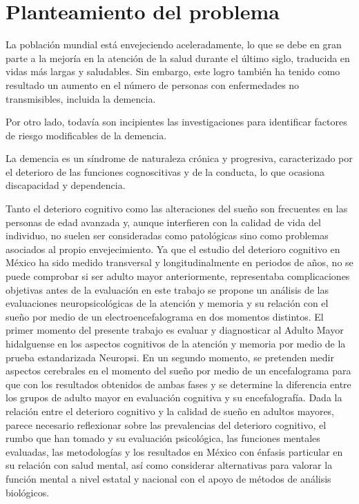\chapter{Planteamiento del problema}

La poblaci\'on mundial est\'a envejeciendo aceleradamente, lo que se debe en gran parte a la 
mejor\'ia en la atenci\'on de la salud durante el \'ultimo siglo, traducida en vidas m\'as 
largas y saludables. Sin embargo, este logro tambi\'en ha tenido como resultado un aumento en el 
n\'umero de personas con enfermedades no transmisibles, incluida la demencia.

Por otro lado, todav\'ia son incipientes las investigaciones para identificar 
factores de riesgo modificables de la demencia.

La demencia es un síndrome de naturaleza cr\'onica y progresiva, caracterizado 
por el deterioro de las funciones cognoscitivas y de la conducta, lo que ocasiona 
discapacidad y dependencia.
\cite{PlanAlzheimer04}



Tanto el deterioro cognitivo como las alteraciones del sueño son frecuentes en las personas de edad avanzada y, aunque interfieren con la calidad de vida del individuo, no suelen ser consideradas como patológicas sino como problemas asociados al propio envejecimiento.
Ya que el estudio del deterioro cognitivo en México ha sido medido transversal y longitudinalmente en periodos de años, no se puede comprobar si ser adulto mayor anteriormente, representaba complicaciones objetivas antes de la evaluación en este trabajo se propone un análisis de las evaluaciones neuropsicológicas de la atención y memoria y su relación con el sueño por medio de un electroencefalograma en dos momentos distintos.
El primer momento del presente trabajo es evaluar y diagnosticar al Adulto Mayor hidalguense en los aspectos cognitivos de la atención y memoria por medio de la prueba estandarizada Neuropsi. En un segundo momento, se pretenden medir aspectos cerebrales en el momento del sueño por medio de un encefalograma para que con los resultados obtenidos de ambas fases y se determine la diferencia entre los grupos de adulto mayor en evaluación cognitiva y su encefalografía.
Dada la relación entre el deterioro cognitivo y la calidad de sueño en adultos mayores, parece necesario reflexionar sobre las prevalencias del deterioro cognitivo, el rumbo que han tomado y su evaluación psicológica, las funciones mentales evaluadas, las metodologías y los resultados en México con énfasis particular en su relación con salud mental, así como considerar alternativas para valorar la función mental a nivel estatal y nacional con el apoyo de métodos de análisis biológicos. 


